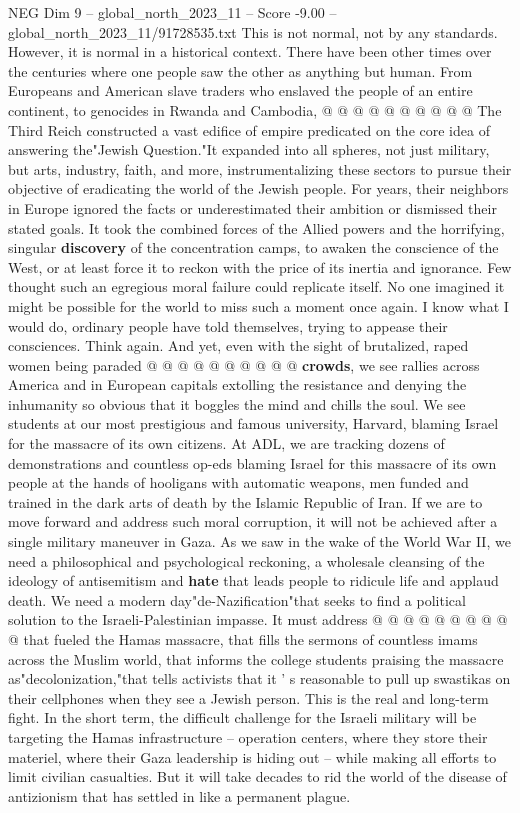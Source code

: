 \begin{textsample}{NEG Dim 9 – global\_north\_2023\_11 – Score -9.00 – global\_north\_2023\_11/91728535.txt}
This is not normal, not by any standards.
However, it is normal in a historical context.
There have been other times over the centuries where one people saw the other as anything but human.
From Europeans and American slave traders who enslaved the people of an entire continent, to genocides in Rwanda and Cambodia, @ @ @ @ @ @ @ @ @ @ The Third Reich constructed a vast edifice of empire predicated on the core idea of answering the"Jewish Question."It expanded into all spheres, not just military, but arts, industry, faith, and more, instrumentalizing these sectors to pursue their objective of eradicating the world of the Jewish people.
For years, their neighbors in Europe ignored the facts or underestimated their ambition or dismissed their stated goals.
It took the combined forces of the Allied powers and the horrifying, singular \textbf{discovery} of the concentration camps, to awaken the conscience of the West, or at least force it to reckon with the price of its inertia and ignorance.
Few thought such an egregious moral failure could replicate itself.
No one imagined it might be possible for the world to miss such a moment once again.
I know what I would do, ordinary people have told themselves, trying to appease their consciences.
Think again.
And yet, even with the sight of brutalized, raped women being paraded @ @ @ @ @ @ @ @ @ @ \textbf{crowds}, we see rallies across America and in European capitals extolling the resistance and denying the inhumanity so obvious that it boggles the mind and chills the soul.
We see students at our most prestigious and famous university, Harvard, blaming Israel for the massacre of its own citizens.
At ADL, we are tracking dozens of demonstrations and countless op-eds blaming Israel for this massacre of its own people at the hands of hooligans with automatic weapons, men funded and trained in the dark arts of death by the Islamic Republic of Iran.
If we are to move forward and address such moral corruption, it will not be achieved after a single military maneuver in Gaza.
As we saw in the wake of the World War II, we need a philosophical and psychological reckoning, a wholesale cleansing of the ideology of antisemitism and \textbf{hate} that leads people to ridicule life and applaud death.
We need a modern day"de-Nazification"that seeks to find a political solution to the Israeli-Palestinian impasse.
It must address @ @ @ @ @ @ @ @ @ @ that fueled the Hamas massacre, that fills the sermons of countless imams across the Muslim world, that informs the college students praising the massacre as"decolonization,"that tells activists that it ' s reasonable to pull up swastikas on their cellphones when they see a Jewish person.
This is the real and long-term fight.
In the short term, the difficult challenge for the Israeli military will be targeting the Hamas infrastructure -- operation centers, where they store their materiel, where their Gaza leadership is hiding out -- while making all efforts to limit civilian casualties.
But it will take decades to rid the world of the disease of antizionism that has settled in like a permanent plague.

\end{textsample}
